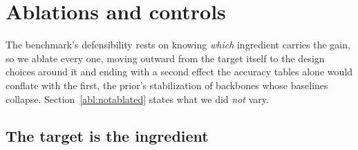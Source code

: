 \section{Ablations and controls}\label{sec:ablations}

 The benchmark's defensibility rests on knowing \emph{which}
ingredient carries the gain, so we ablate every one, moving outward from the
target itself to the design choices around it and ending with a second effect
the accuracy tables alone would conflate with the first, the prior's
stabilization of backbones whose baselines collapse.
Section~\ref{abl:notablated} states what we did \emph{not} vary.

\subsection{The target is the ingredient}\label{abl:target}
